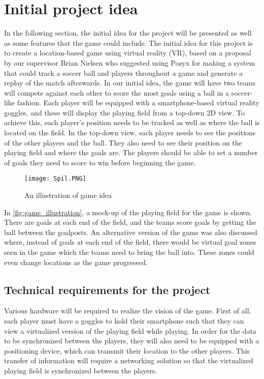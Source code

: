 \section{Initial project idea}\label{sec:projectidea}
In the following section, the initial idea for the project will be presented as well as some features that the game could include.
The initial idea for this project is to create a location-based game using virtual reality (VR), based on a proposal by our supervisor Brian Nielsen who suggested using Pozyx for making a system that could track a soccer ball and players throughout a game and generate a replay of the match afterwards.
In our initial idea, the game will have two teams will compete against each other to score the most goals using a ball in a soccer-like fashion.
Each player will be equipped with a smartphone-based virtual reality goggles, and these will display the playing field from a top-down 2D view. 
To achieve this, each player's position needs to be tracked as well as where the ball is located on the field.
In the top-down view, each player needs to see the positions of the other players and the ball.
They also need to see their position on the playing field and where the goals are.
The players should be able to set a number of goals they need to score to win before beginning the game. 
\begin{figure}[H]
    \centering
    \texttt{[image: Spil.PNG]}
    \caption{An illustration of game idea}
    \label{fig:game_illustration}
\end{figure}
\noindent
In \autoref{fig:game_illustration}, a mock-up of the playing field for the game is shown.
There are goals at each end of the field, and the teams score goals by getting the ball between the goalposts.
An alternative version of the game was also discussed where, instead of goals at each end of the field, there would be virtual goal zones seen in the game which the teams need to bring the ball into.
These zones could even change locations as the game progressed.

\subsection{Technical requirements for the project}
Various hardware will be required to realize the vision of the game.
First of all, each player must have a goggles to hold their smartphone such that they can view a virtualized version of the playing field while playing.
In order for the data to be synchronized between the players, they will also need to be equipped with a positioning device, which can transmit their location to the other players.
This transfer of information will require a networking solution so that the virtualized playing field is synchronized between the players.

